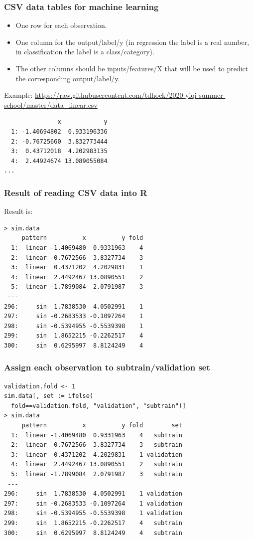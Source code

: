 \documentclass{beamer}
\begin{document}
\begin{frame}[fragile]
  \frametitle{CSV data tables for machine learning}
  \begin{itemize}
  \item One row for each observation.
  \item One column for the output/label/y (in regression the label is a real
    number, in classification the label is a class/category).
  \item The other columns should be inputs/features/X that will be used
    to predict the corresponding output/label/y.
  \end{itemize}

  Example:
  \url{https://raw.githubusercontent.com/tdhock/2020-yiqi-summer-school/master/data_linear.csv}

\begin{verbatim}
               x            y
  1: -1.40694802  0.933196336
  2: -0.76725660  3.832773444
  3:  0.43712018  4.202983135
  4:  2.44924674 13.089055084
...
\end{verbatim}
\end{frame}

\begin{frame}[fragile]
  \frametitle{Result of reading CSV data into R}
  Result is:

\begin{verbatim}
> sim.data
     pattern          x          y fold
  1:  linear -1.4069480  0.9331963    4
  2:  linear -0.7672566  3.8327734    3
  3:  linear  0.4371202  4.2029831    1
  4:  linear  2.4492467 13.0890551    2
  5:  linear -1.7899084  2.0791987    3
 ---                                   
296:     sin  1.7838530  4.0502991    1
297:     sin -0.2683533 -0.1097264    1
298:     sin -0.5394955 -0.5539398    1
299:     sin  1.8652215 -0.2262517    4
300:     sin  0.6295997  8.8124249    4
\end{verbatim}
  
\end{frame}

\begin{frame}[fragile]
  \frametitle{Assign each observation to subtrain/validation set}

\begin{verbatim}
validation.fold <- 1
sim.data[, set := ifelse(
  fold==validation.fold, "validation", "subtrain")]
> sim.data
     pattern          x          y fold        set
  1:  linear -1.4069480  0.9331963    4   subtrain
  2:  linear -0.7672566  3.8327734    3   subtrain
  3:  linear  0.4371202  4.2029831    1 validation
  4:  linear  2.4492467 13.0890551    2   subtrain
  5:  linear -1.7899084  2.0791987    3   subtrain
 ---                                              
296:     sin  1.7838530  4.0502991    1 validation
297:     sin -0.2683533 -0.1097264    1 validation
298:     sin -0.5394955 -0.5539398    1 validation
299:     sin  1.8652215 -0.2262517    4   subtrain
300:     sin  0.6295997  8.8124249    4   subtrain
\end{verbatim}
  
\end{frame}
\end{document}
